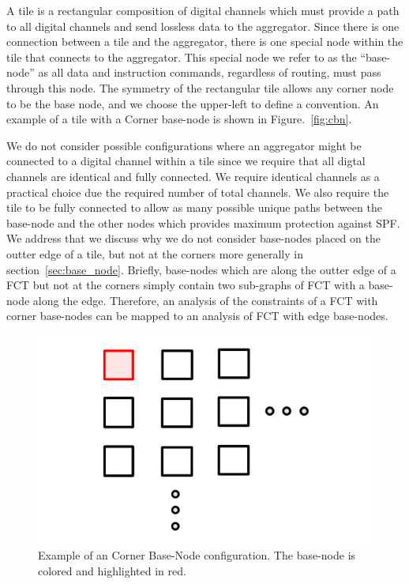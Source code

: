 A tile is a rectangular composition of digital channels which must provide a path to all digital channels and send lossless data to the aggregator.
Since there is one connection between a tile and the aggregator, there is one special node within the tile that connects to the aggregator.
This special node we refer to as the ``base-node'' as all data and instruction commands, regardless of routing, must pass through this node.
The symmetry of the rectangular tile allows any corner node to be the base node, and we choose the upper-left to define a convention.
An example of a tile with a Corner base-node is shown in Figure.~\ref{fig:cbn}.

We do not consider possible configurations where an aggregator might be connected to a digital channel within a tile since we require that all digtal channels are identical and fully connected.
We require identical channels as a practical choice due the required number of total channels.
We also require the tile to be fully connected to allow as many possible unique paths between the base-node and the other nodes which provides maximum protection against SPF.
We address that we discuss why we do not consider base-nodes placed on the outter edge of a tile, but not at the corners more generally in section~\ref{sec:base_node}.
Briefly, base-nodes which are along the outter edge of a FCT but not at the corners simply contain two sub-graphs of FCT with a base-node along the edge.
Therefore, an analysis of the constraints of a FCT with corner base-nodes can be mapped to an analysis of FCT with edge base-nodes.

\begin{figure}[]
\centering
\includegraphics[width=\textwidth]{images/CBN.pdf}
\caption{Example of an Corner Base-Node configuration. The base-node is colored and highlighted in red.}
\end{figure}~\label{fig:cbn}

